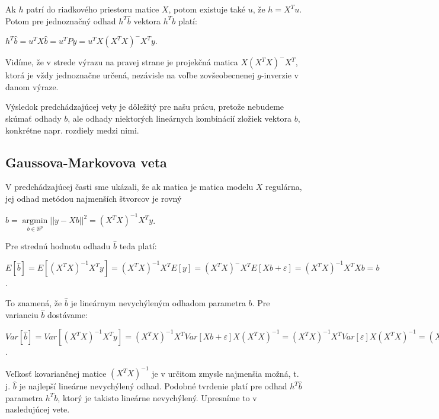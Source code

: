 Ak $h$ patrí do riadkového priestoru matice $X$, potom existuje také $u$, že $h = X^T u$.
Potom pre jednoznačný odhad $h^T \hat{b}$ vektora $h^T b$ platí:

\begin{center}
$h^T \hat{b} = u^T X \hat{b} = u^T P y = u^T X(X^T X)^- X^T y$.
\end{center}

Vidíme, že v strede výrazu na pravej strane je projekčná matica $X(X^T X)^- X^T$, ktorá je vždy jednoznačne určená, 
nezávisle na voľbe zovšeobecnenej $g$-inverzie v danom výraze.

Výsledok predchádzajúcej vety je dôležitý pre našu prácu, pretože nebudeme skúmať odhady $b$,
ale odhady niektorých lineárnych kombinácií zložiek vektora $b$, 
konkrétne napr. rozdiely medzi nimi.

\subsection{Gaussova-Markovova veta}

V predchádzajúcej časti sme ukázali, že ak matica je matica modelu $X$ regulárna,
jej odhad metódou najmenších štvorcov je rovný

\begin{center}
$
\hat{b} = \underset{b \in \mathbb{R}^{p}}{\operatorname{arg min}} ||y - Xb||^2 = (X^T X)^{-1} X^T y
$.
\end{center}

Pre strednú hodnotu odhadu $\hat{b}$ teda platí:

\begin{center}
$
E[\hat{b}] = E[(X^T X)^{-1} X^T y] = (X^T X)^{-1} X^T E[y] = (X^T X)^- X^T E[Xb + \varepsilon] = (X^T X)^{-1} X^T X b = b
$.
\end{center}

To znamená, že $\hat{b}$ je lineárnym nevychýleným odhadom parametra $b$.
Pre varianciu $\hat{b}$ dostávame:

\begin{center}
$
Var[\hat{b}] = Var[(X^T X)^{-1} X^T y] = (X^T X)^{-1} X^T Var[Xb + \varepsilon] X (X^T X)^{-1} =
(X^T X)^{-1} X^T Var[\varepsilon] X (X^T X)^{-1} = (X^T X)^{-1} X^T I X (X^T X)^{-1} = (X^T X)^{-1}
$.
\end{center}

Veľkosť kovariančnej matice $(X^T X)^{-1}$ je v určitom zmysle najmenšia možná, t. j. $\hat{b}$ je najlepší lineárne nevychýlený odhad.
Podobné tvrdenie platí pre odhad $h^T \hat{b}$ parametra $h^T b$, ktorý je takisto lineárne nevychýlený. Upresníme to v nasledujúcej vete.

